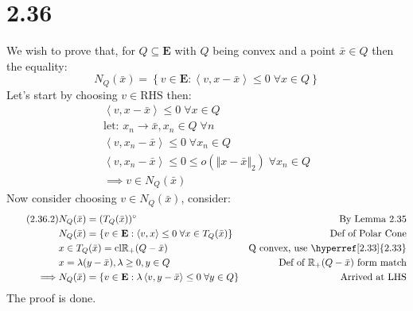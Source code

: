 \documentclass[]{article}
\begin{document}
\section*{2.36} \label{2.36}
    We wish to prove that, for $Q \subseteq \mathbf{E}$ with $Q$ being convex and a point $\bar{x} \in Q$ then the equality: 
    $$
        N_Q(\bar{x}) = \left\lbrace
            v \in \mathbf{E}: \left\langle v, x - \bar{x} \right\rangle \le 0 
            \; \forall x \in Q
        \right\rbrace
    $$
    Let's start by choosing $v \in \text{RHS}$ then: 
    \begin{align*}\tag{2.36.1}\label{eqn:2.36.1}
        \left\langle v, x - \bar{x} \right\rangle \le 0 \; \forall x \in Q
        \\
        \text{let: }x_n \rightarrow \bar{x}, x_n \in Q\;\forall n
        \\
        \left\langle v, x_n - \bar{x} \right\rangle \le 0 \;\forall x_n \in Q
        \\
        \left\langle v, x_n - \bar{x} \right\rangle \le 0\le o(\Vert x - \bar{x}\Vert_2) \;\forall x_n \in Q 
        \\\implies
        v \in N_Q(\bar{x})
    \end{align*}
    Now consider choosing $v \in N_Q(\bar{x})$, consider: 
    \begin{align*}\tag{2.36.2}\label{eqn:2.36.2}
        & N_Q(\bar{x}) = (T_Q(\bar{x}))^\circ & \text{By Lemma 2.35}
        \\
        & N_Q(\bar{x}) = \left\lbrace
            v \in \mathbf{E}: \left\langle v, x \right\rangle\le 0 \;\forall x \in T_Q(\bar{x})
        \right\rbrace & \text{Def of Polar Cone}
        \\
        &x \in T_Q(\bar{x}) = \text{cl}\mathbb{R}_+(Q - \bar{x})& \text{Q convex, use \hyperref[2.33]{2.33}}
        \\
        &x = \lambda(y - \bar{x}), \lambda \ge 0 , y\in Q & \text{Def of } \mathbb{R}_+(Q - \bar{x}) \text{ form match}
        \\
        \implies&
        N_Q(\bar{x}) = \left\lbrace
        v \in \mathbf{E}: \lambda\left\langle v, y - \bar{x} \right\rangle\le 0 \;\forall y \in Q 
    \right\rbrace &\text{Arrived at LHS}
    \end{align*}
    The proof is done. 
\end{document}

